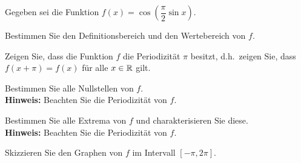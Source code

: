\Aufgabe[e]{}
{
%  
Gegeben sei die Funktion $f(x) = \cos \left(\dfrac{\pi}{2} \sin x\right)$.

\begin{iii}
 
 \item Bestimmen Sie den Definitionsbereich und den Wertebereich von $f$. 
 
 \item Zeigen Sie, dass die Funktion $f$ die Periodizität $\pi$ besitzt, d.h.\ zeigen Sie, dass $f(x+\pi) = f(x)$ für alle $x\in \mathbb{R}$ gilt.
 
 \item Bestimmen Sie alle Nullstellen von $f$.\\[0.5ex]
 \textbf{Hinweis:} Beachten Sie die Periodizität von $f$.
 
 \item Bestimmen Sie alle Extrema von $f$ und charakterisieren Sie diese.\\[0.5ex]
 \textbf{Hinweis:} Beachten Sie die Periodizität von $f$.
 
 \item Skizzieren Sie den Graphen von $f$ im Intervall $[-\pi,2\pi]$. 
 
\end{iii}
% 
% 
% 
% 
}


